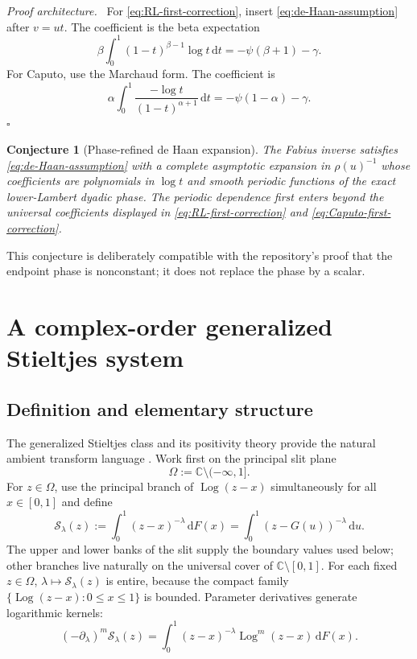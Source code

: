 \documentclass[11pt,oneside]{article}
\newtheorem{conjecture}[theorem]{Conjecture}
\theoremstyle{definition}
\theoremstyle{remark}
\newcommand{\C}{\mathbb C}
\newcommand{\Log}{\operatorname{Log}}
\newcommand{\dd}{\,\mathrm d}
\newcommand{\Sord}{\mathcal S}
\newenvironment{proofidea}{\par\smallskip\noindent\textit{Proof architecture.}\ }{\hfill$\square$\par\smallskip}
\begin{document}
\begin{proofidea}
For \eqref{eq:RL-first-correction}, insert
\eqref{eq:de-Haan-assumption} after $v=ut$.  The coefficient is the beta
expectation
\begin{equation}
 \beta\int_0^1(1-t)^{\beta-1}\log t\dd t
 =-\psi(\beta+1)-\gamma.
\end{equation}
For Caputo, use the Marchaud form.  The coefficient is
\begin{equation}
 \alpha\int_0^1\frac{-\log t}{(1-t)^{\alpha+1}}\dd t
 =-\psi(1-\alpha)-\gamma.
\end{equation}
\end{proofidea}

\begin{conjecture}[Phase-refined de Haan expansion]
\label{conj:de-Haan}
The Fabius inverse satisfies \eqref{eq:de-Haan-assumption} with a complete
asymptotic expansion in $\rho(u)^{-1}$ whose coefficients are polynomials in
$\log t$ and smooth periodic functions of the exact lower-Lambert dyadic
phase.  The periodic dependence first enters beyond the universal
coefficients displayed in \eqref{eq:RL-first-correction} and
\eqref{eq:Caputo-first-correction}.
\end{conjecture}

This conjecture is deliberately compatible with the repository's proof that
the endpoint phase is nonconstant; it does not replace the phase by a scalar.

\section{A complex-order generalized Stieltjes system}
\label{sec:stieltjes}

\subsection{Definition and elementary structure}

The generalized Stieltjes class and its positivity theory provide the
natural ambient transform language \cite{Sokal}.  Work first on the principal
slit plane
\begin{equation}
 \Omega:=\C\setminus(-\infty,1].
\end{equation}
For $z\in\Omega$, use the principal branch of $\Log(z-x)$ simultaneously for
all $x\in[0,1]$ and define
\begin{equation}
 \Sord_\lambda(z)
 :=\int_0^1(z-x)^{-\lambda}\dd F(x)
 =\int_0^1(z-G(u))^{-\lambda}\dd u.
 \label{eq:generalized-Stieltjes-def}
\end{equation}
The upper and lower banks of the slit supply the boundary values used below;
other branches live naturally on the universal cover of
$\C\setminus[0,1]$.  For each fixed $z\in\Omega$,
$\lambda\mapsto\Sord_\lambda(z)$ is entire, because the compact family
$\{\Log(z-x):0\le x\le1\}$ is bounded.  Parameter derivatives
generate logarithmic kernels:
\begin{equation}
 (-\partial_\lambda)^m\Sord_\lambda(z)
 =\int_0^1(z-x)^{-\lambda}\Log^m(z-x)\dd F(x).
 \label{eq:lambda-log-kernels}
\end{equation}
\end{document}
